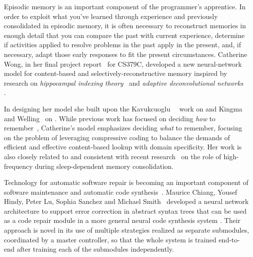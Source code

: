 
Episodic memory is an important component of the programmer's apprentice. In order to exploit what you've learned through experience and previously consolidated in episodic memory, it is often necessary to reconstruct memories in enough detail that you can compare the past with current experience, determine if activities applied to resolve problems in the past apply in the present, and, if necessary, adapt those early responses to fit the present circumstances. Catherine Wong, in her final project report~\cite{CS379C_Final_Project_Wong-18} for CS379C, developed a new neural-network model for content-based and selectively-reconstructive memory inspired by research on {\it{hippocampal indexing theory}}~\cite{TeylerandRudyHIPPOCAMPUS-07} and {\it{adaptive deconvolutional networks}}~\cite{ZeileretalICCV-11,ZeileretalCVPR-10} {}. 

In designing her model she built upon the Kavukcuoglu~\etal{}~\cite{KavukcuogluetalNIPS-10} work on {} and Kingma and Welling~\cite{KingmaandWellingCoRR-13} on {}. While previous work has focused on deciding {\it{how}} to remember~\cite{WayneetalCoRR-18}, Catherine's model emphasizes deciding {\it{what}} to remember, focusing on the problem of leveraging compressive coding to balance the demands of efficient and effective content-based lookup with domain specificity. Her work is also closely related to and consistent with recent research~\cite{LatchoumaneetalNEURON-17,FanetalJCN-17,NielsenNLM-15} on the role of high-frequency {} during sleep-dependent memory consolidation.


Technology for automatic software repair is becoming an important component of software maintenance and automatic code synthesis~\cite{MonperrusACM-17}. Maurice Chiang, Yousef Hindy, Peter Lu, Sophia Sanchez and Michael Smith~\cite{CS379C_Final_Project_Luetal-18} developed a neural network architecture to support error correction in abstract syntax trees that can be used as a code repair module in a more general neural code synthesis system {}. Their approach is novel in its use of multiple strategies realized as separate submodules, coordinated by a master controller, so that the whole system is trained end-to-end after training each of the submodules independently. 

